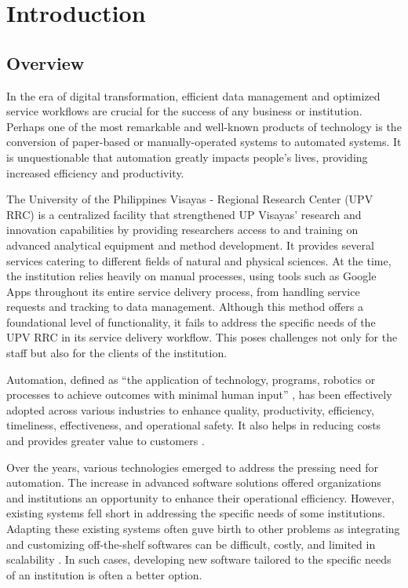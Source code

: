 \chapter{Introduction}
\label{sec:researchdesc}    %

\section{Overview}
\label{sec:overview}

In the era of digital transformation, efficient data management and optimized service workflows are crucial for the success of any business or institution. Perhaps one of the most remarkable and well-known products of technology is the conversion of paper-based or manually-operated systems to automated systems. It is unquestionable that automation greatly impacts people's lives, providing increased efficiency and productivity.

The University of the Philippines Visayas - Regional Research Center (UPV RRC) is a centralized facility that strengthened UP Visayas’ research and innovation capabilities by providing researchers access to and training on advanced analytical equipment and method development. It provides several services catering to different fields of natural and physical sciences. At the time, the institution relies heavily on manual processes, using tools such as Google Apps throughout its entire service delivery process, from handling service requests and tracking to data management. Although this method offers a foundational level of functionality, it fails to address the specific needs of the UPV RRC in its service delivery workflow. This poses challenges not only for the staff but also for the clients of the institution.

Automation, defined as “the application of technology, programs, robotics or processes to achieve outcomes with minimal human input” \cite{ibm}, has been effectively adopted across various industries to enhance quality, productivity, efficiency, timeliness, effectiveness, and operational safety. It also helps in reducing costs and provides greater value to customers \cite{caban2021}. 

Over the years, various technologies emerged to address the pressing need for automation. The increase in advanced software solutions offered organizations and institutions an opportunity to enhance their operational efficiency. However, existing systems fell short in addressing the specific needs of some institutions. Adapting these existing systems often guve birth to other problems as integrating and customizing off-the-shelf softwares can be difficult, costly, and limited in scalability \cite{bitcat2023}. In such cases, developing new software tailored to the specific needs of an institution is often a better option.

